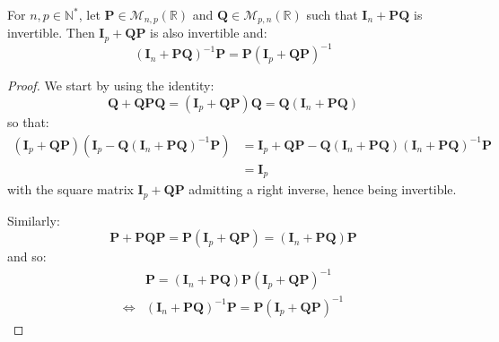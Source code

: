 \begin{proposition}\label{th:push_through}
	For $n,p\in\mathbb{N}^*$, let $\mathbf{P}\in\mathcal{M}_{n,p}(\mathbb{R})$ and $\mathbf{Q}\in\mathcal{M}_{p,n}(\mathbb{R})$ such that $\mathbf{I}_n+\mathbf{P}\mathbf{Q}$ is invertible. Then $\mathbf{I}_p+\mathbf{Q}\mathbf{P}$ is also invertible and:
	\begin{equation}
		(\mathbf{I}_n+\mathbf{P}\mathbf{Q})^{-1}\mathbf{P}=\mathbf{P}(\mathbf{I}_p+\mathbf{Q}\mathbf{P})^{-1}
	\end{equation}
\end{proposition}

\begin{proof}
	We start by using the identity:
	\begin{equation}
		\mathbf{Q}+\mathbf{Q}\mathbf{P}\mathbf{Q}=(\mathbf{I}_p+\mathbf{Q}\mathbf{P})\mathbf{Q}=\mathbf{Q}(\mathbf{I}_n+\mathbf{P}\mathbf{Q})
	\end{equation}
	so that:
	\begin{equation}
		\begin{aligned}
		(\mathbf{I}_p+\mathbf{Q}\mathbf{P})\left(\mathbf{I}_p-\mathbf{Q}(\mathbf{I}_n+\mathbf{P}\mathbf{Q})^{-1}\mathbf{P}\right)&=\mathbf{I}_p+\mathbf{Q}\mathbf{P}-\mathbf{Q}(\mathbf{I}_n+\mathbf{P}\mathbf{Q})(\mathbf{I}_n+\mathbf{P}\mathbf{Q})^{-1}\mathbf{P}\\
		&=\mathbf{I}_p
		\end{aligned}
	\end{equation}
	with the square matrix $\mathbf{I}_p+\mathbf{Q}\mathbf{P}$ admitting a right inverse, hence being invertible.

	Similarly:
	\begin{equation}
		\mathbf{P}+\mathbf{P}\mathbf{Q}\mathbf{P}=\mathbf{P}(\mathbf{I}_p+\mathbf{Q}\mathbf{P})=(\mathbf{I}_n+\mathbf{P}\mathbf{Q})\mathbf{P}
	\end{equation}
	and so:
	\begin{equation}
		\begin{aligned}
		&\mathbf{P}=(\mathbf{I}_n+\mathbf{P}\mathbf{Q})\mathbf{P}(\mathbf{I}_p+\mathbf{Q}\mathbf{P})^{-1}\\
		\iff&(\mathbf{I}_n+\mathbf{P}\mathbf{Q})^{-1}\mathbf{P}=\mathbf{P}(\mathbf{I}_p+\mathbf{Q}\mathbf{P})^{-1}
		\end{aligned}
	\end{equation}
\end{proof}

